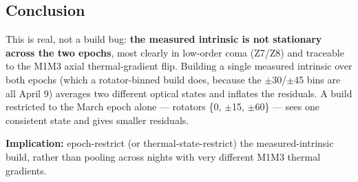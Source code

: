 \subsection{Conclusion}\label{conclusion}

This is real, not a build bug: \textbf{the measured intrinsic is not
stationary across the two epochs}, most clearly in low-order coma
(Z7/Z8) and traceable to the M1M3 axial thermal-gradient flip. Building
a single measured intrinsic over both epochs (which a rotator-binned
build does, because the $\pm$30/$\pm$45 bins are all April 9) averages two
different optical states and inflates the residuals. A build restricted
to the March epoch alone --- rotators \{0, $\pm$15, $\pm$60\} --- sees one
consistent state and gives smaller residuals.

\textbf{Implication:} epoch-restrict (or thermal-state-restrict) the
measured-intrinsic build, rather than pooling across nights with very
different M1M3 thermal gradients.
